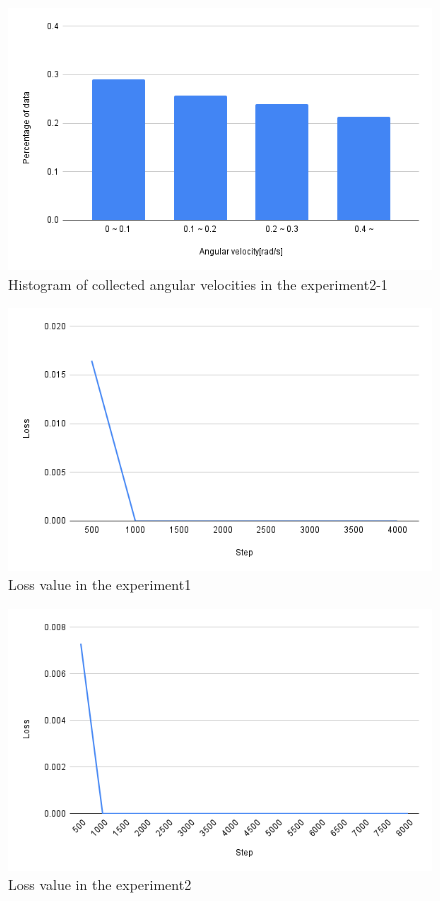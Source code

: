 \begin{figure}[h]
  \centering
  \includegraphics[keepaspectratio, scale=0.4]{images/exp2.png}
  \caption{Histogram of collected angular velocities in the experiment2-1}
  \label{Fig:exp2}
  \end{figure}

\newpage
\begin{figure}[h]
  \centering
  \includegraphics[keepaspectratio, scale=0.31]{images/exp2-4000.png}
  \caption{Loss value in the experiment1}
  \label{Fig:exp2-4000}
  \end{figure}

\begin{figure}[h]
  \centering
  \includegraphics[keepaspectratio, scale=0.31]{images/exp2-8000.png}
  \caption{Loss value in the experiment2}
  \label{Fig:exp2-8000}
  \end{figure}


